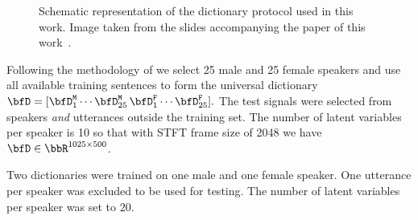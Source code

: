 \begin{figure}[h]
    \begin{fullwidth}
    \centering
    \hfill
        \caption{Schematic representation of the dictionary protocol used in this work.
        Image taken from the slides accompanying the paper of this work~.}
    \label{fig:separake:dictionaries}
    \end{fullwidth}
\end{figure}


 Following the methodology of  we select 25 male and 25 female speakers
and use all available training sentences to form the universal dictionary
$
    \mD = [\mD_1^\mathtt{M}\cdots \mD_{25}^\mathtt{M}\,\mD_{1}^\mathtt{F}\cdots\mD_{25}^\mathtt{F}].
$
The test signals were selected from speakers \emph{and} utterances outside the training set.
The number of latent variables per speaker is 10 so that with STFT frame size of 2048 we have $\mD\in\R^{1025\times500}$.

Two dictionaries were trained on one male and one female speaker.
One utterance per speaker was excluded to be used for testing.
The number of latent variables per speaker was set to $20$.

